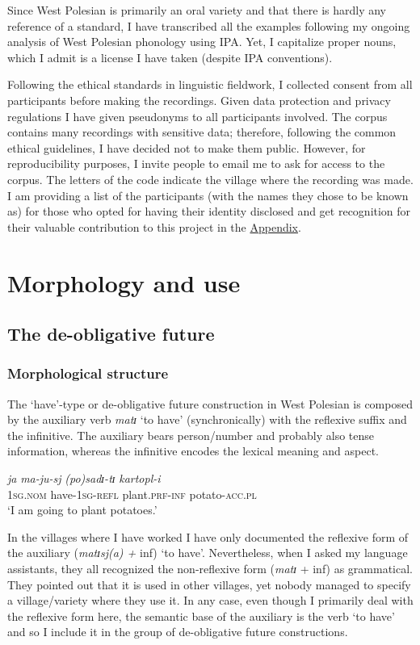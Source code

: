 \documentclass[output=paper,colorlinks,citecolor=brown]{langscibook}
\begin{document}
Since West Polesian is primarily an oral variety and that there is hardly any reference of a standard, I have transcribed all the examples following my ongoing analysis of West Polesian phonology using IPA. Yet, I capitalize proper nouns, which I admit is a license I have taken (despite IPA conventions). 

Following the ethical standards in linguistic fieldwork, I collected consent from all participants before making the recordings. Given data protection and privacy regulations I have given pseudonyms to all participants involved. The corpus contains many recordings with sensitive data; therefore, following the common ethical guidelines, I have decided not to make them public. However, for reproducibility purposes, I invite people to email me to ask for access to the corpus. The letters of the code indicate the village where the recording was made. I am providing a list of the participants (with the names they chose to be known as) for those who opted for having their identity disclosed and get recognition for their valuable contribution to this project in the \hyperref[sec:roncero:app1]{Appendix}.

\section{Morphology and use} \label{sec:roncero:2}
\subsection{The de-obligative future} \label{sec:roncero:2.1}
\subsubsection{Morphological structure} \label{sec:roncero:2.1.1}
The ‘have’-type or de-obligative future construction in West Polesian is composed by the auxiliary verb \textit{matɪ} ‘to have’ (synchronically) with the reflexive suffix and the infinitive. The auxiliary bears person/number and probably also tense information, whereas the infinitive encodes the lexical meaning and aspect.

\ea \label{ex:roncero:7}
     \gll \textit{ja} \textit{ma-ju-sj} \textit{(po)sadɪ-tɪ} \textit{kartopl-i}\\
     1\textsc{sg.nom} have-\textsc{1sg-refl} plant.\textsc{prf-inf} potato-\textsc{acc.pl}\\
     \glt ‘I am going to plant potatoes.’  
\z


In the villages where I have worked I have only documented the reflexive form of the auxiliary (\textit{matɪsj(a) +} inf) ‘to have’. Nevertheless, when I asked my language assistants, they all recognized the non-reflexive form (\textit{matɪ} + inf) as grammatical. They pointed out that it is used in other villages, yet nobody managed to specify a village/variety where they use it. In any case, even though I primarily deal with the reflexive form here, the semantic base of the auxiliary is the verb ‘to have’ and so I include it in the group of de-obligative future constructions.
\end{document}
